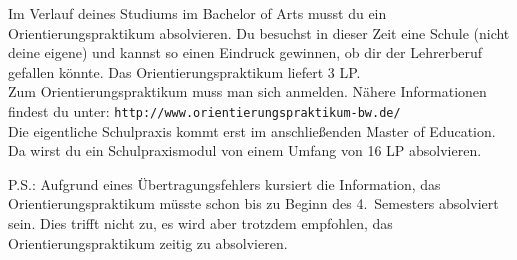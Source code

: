 Im Verlauf deines Studiums im Bachelor of Arts
musst du ein Orientierungspraktikum absolvieren.
Du besuchst in dieser Zeit eine Schule (nicht deine eigene)
und kannst so einen Eindruck gewinnen,
ob dir der Lehrerberuf gefallen könnte.
Das Orientierungspraktikum liefert 3 LP.\\
Zum Orientierungspraktikum muss man sich anmelden.
Nähere Informationen findest du unter:
\verb|http://www.orientierungspraktikum-bw.de/|\\
Die eigentliche Schulpraxis kommt erst im anschließenden
Master of Education.
Da wirst du ein Schulpraxismodul
von einem Umfang von 16 LP absolvieren.

{\small P.S.: Aufgrund eines Übertragungsfehlers
kursiert die Information,
das Orientierungspraktikum müsste schon
bis zu Beginn des 4.\ Semesters absolviert sein.
Dies trifft nicht zu, es wird aber trotzdem empfohlen,
das Orientierungspraktikum zeitig zu absolvieren.}

\vspace*{1cm}







